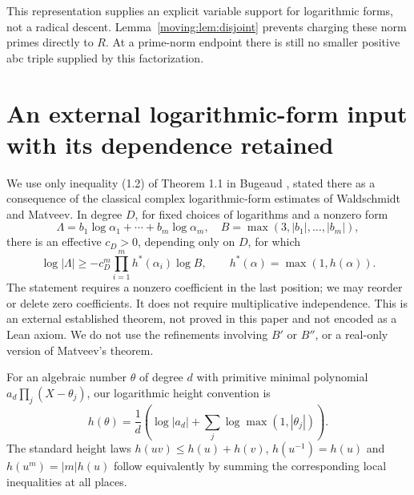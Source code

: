 This representation supplies an explicit variable support for logarithmic forms, not a radical descent. Lemma~\ref{moving:lem:disjoint} prevents charging these norm primes directly to $R$. At a prime-norm endpoint there is still no smaller positive abc triple supplied by this factorization.

\section{An external logarithmic-form input with its dependence retained}
We use only inequality (1.2) of Theorem 1.1 in Bugeaud \cite{moving:bugeaud}, stated there as a consequence of the classical complex logarithmic-form estimates of Waldschmidt and Matveev. In degree $D$, for fixed choices of logarithms and a nonzero form
\[
 \Lambda=b_1\log\alpha_1+\cdots+b_m\log\alpha_m,
 \quad B=\max(3,|b_1|,\ldots,|b_m|),
\]
there is an effective $c_D>0$, depending only on $D$, for which
\begin{equation}\label{moving:eq:external}
 \log|\Lambda|\ge-c_D^m\prod_{i=1}^m h^*(\alpha_i)\log B,
 \qquad h^*(\alpha)=\max(1,h(\alpha)).
\end{equation}
The statement requires a nonzero coefficient in the last position; we may reorder or delete zero coefficients. It does not require multiplicative independence. This is an external established theorem, not proved in this paper and not encoded as a Lean axiom. We do not use the refinements involving $B'$ or $B''$, or a real-only version of Matveev's theorem.

For an algebraic number $\theta$ of degree $d$ with primitive minimal polynomial $a_d\prod_j(X-\theta_j)$, our logarithmic height convention is
\[
 h(\theta)=\frac1d\left(\log|a_d|+\sum_j\log\max(1,|\theta_j|)\right).
\]
The standard height laws $h(uv)\le h(u)+h(v)$, $h(u^{-1})=h(u)$ and $h(u^m)=|m|h(u)$ follow equivalently by summing the corresponding local inequalities at all places.

